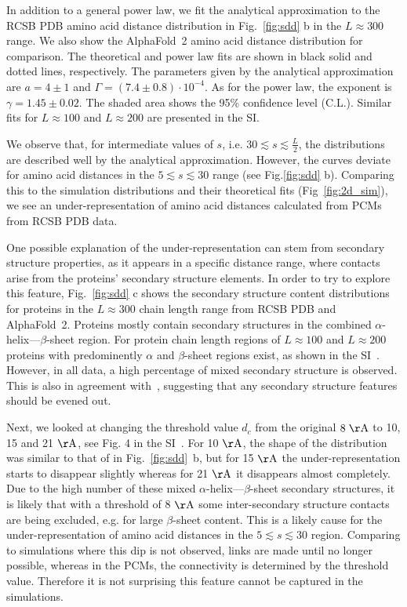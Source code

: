 \documentclass[
reprint,
twocolumn,
amsmath,amssymb,superscriptaddress,aps,
pre]{revtex4-1}
\begin{document}
In addition to a general power law, we fit the analytical approximation to the RCSB PDB amino acid distance distribution in Fig.~\ref{fig:sdd} b in the $L\approx300$ range. We also show the AlphaFold~2 amino acid distance distribution for comparison. The theoretical and power law fits are shown in black solid and dotted lines, respectively. The parameters given by the analytical approximation are $a=4 \pm 1$ and $\Gamma=(7.4 \pm 0.8)\cdot 10^{-4}$. As for the power law, the exponent is $\gamma=1.45 \pm 0.02$. The shaded area shows the 95\% confidence level (C.L.). Similar fits for $L\approx100$ and $L\approx200$ are presented in the SI.


We observe that, for intermediate values of $s$, i.e. $30\lesssim s\lesssim \frac{L}{2}$, the distributions are described well by the analytical approximation. However, the curves deviate for amino acid distances in the $5\lesssim s \lesssim 30$ range (see Fig.\ref{fig:sdd} b). Comparing this to the simulation distributions and their theoretical fits (Fig~\ref{fig:2d_sim}), we see an under-representation of amino acid distances calculated from PCMs from RCSB PDB data. 

One possible explanation of the under-representation can stem from secondary structure properties, as it appears in a specific distance range, where contacts arise from the proteins' secondary structure elements. In order to try to explore this feature, Fig.~\ref{fig:sdd} c shows the secondary structure content distributions for proteins in the $L\approx300$ chain length range from RCSB PDB and AlphaFold~2. Proteins mostly contain secondary structures in the combined $\alpha$-helix---$\beta$-sheet region. For protein chain length regions of $L\approx100$ and $L\approx200$ proteins with predominently $\alpha$ and $\beta$-sheet regions exist, as shown in the SI~\cite{SI}. However, in all data, a high percentage of mixed secondary structure is observed. This is also in agreement with~\cite{michie1996analysis}, suggesting that any secondary structure features should be evened out. 

Next, we looked at changing the threshold value $d_c$ from the original $8 \; \mathrm{\AA}$ to 10, 15 and 21 $\mathrm{\AA}$, see Fig. 4 in the SI~\cite{SI}. For 10 $\mathrm{\AA}$, the shape of the distribution was similar to that of in Fig.~\ref{fig:sdd}~b, but for 15 $\mathrm{\AA}$ the under-representation starts to disappear slightly whereas for 21 $\mathrm{\AA}$ it disappears almost completely. Due to the high number of these mixed $\alpha$-helix---$\beta$-sheet secondary structures, it is likely that with a threshold of 8 $\mathrm{\AA}$ some inter-secondary structure contacts are being excluded, e.g. for large $\beta$-sheet content. This is a likely cause for the under-representation of amino acid distances in the $5 \lesssim s \lesssim 30$ region. Comparing to simulations where this dip is not observed, links are made until no longer possible, whereas in the PCMs, the connectivity is determined by the threshold value. Therefore it is not surprising this feature cannot be captured in the simulations. 
\end{document}
